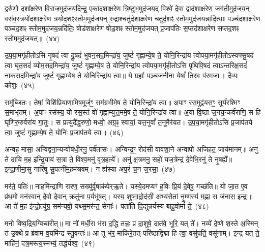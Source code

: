 द्वरु॑णो॒ दशा᳚क्षरेण वि॒राज॒मुद॑जय॒दिन्द्र॒ एका॑\-दशा\-क्षरेण त्रि॒ष्टुभ॒मुद॑जय॒द् विश्वे॑ दे॒वा द्वाद॑शाक्षरेण॒ जग॑ती॒मुद॑जय॒न् वस॑व॒स्त्रयो॑\-दशा\-क्षरेण त्रयोद॒शꣴस्तोम॒मुद॑जयन् रु॒द्राश्चतु॑र्दशा\-क्षरेण चतुर्द॒शꣴ स्तोम॒मुद॑जयन्नादि॒त्याः पञ्च॑\-दशा\-क्षरेण पञ्चद॒शꣴ स्तोम॒मुद॑जय॒न्नदि॑तिः॒ षोड॑शाक्षरेण षोड॒शꣴ स्तोम॒मुद॑जयत् प्र॒जा\-प॑तिः स॒प्तद॑शाक्षरेण सप्तद॒शꣴ स्तोम॒मुद॑जयत्॥~(४४)

{\anuvakamend[{अ॒ज॒य॒त् षट्च॑त्वारिꣳशच्च}]}%

उ॒प॒या॒मगृ॑हीतो\-ऽसि नृ॒षदं॑ त्वा द्रु॒षदं॑ भुवन॒सद॒मिन्द्रा॑य॒ जुष्टं॑ गृह्णाम्ये॒ष ते॒ योनि॒रिन्द्रा॑य त्वोपया॒मगृ॑हीतो\-ऽस्यफ्सु॒षदं॑ त्वा घृत॒सदं॑ व्योम॒सद॒मिन्द्रा॑य॒ जुष्टं॑ गृह्णाम्ये॒ष ते॒ योनि॒रिन्द्रा॑य त्वोपया॒मगृ॑हीतो\-ऽसि पृथिवि॒षदं॑ त्वा\-ऽन्तरिक्ष॒सदं॑ नाक॒सद॒मिन्द्रा॑य॒ जुष्टं॑ गृह्णाम्ये॒ष ते॒ योनि॒रिन्द्रा॑य त्वा॥ ये ग्रहाः᳚ पञ्चज॒नीना॒ येषां᳚ ति॒स्रः प॑रम॒जाः। दैव्यः॒ कोशः॒~(४५)

समु॑ब्जितः। तेषां॒ विशि॑प्रियाणा॒मिष॒मूर्ज॒ꣳ॒ सम॑ग्रभीमे॒ष ते॒ योनि॒रिन्द्रा॑य त्वा॥ अ॒पाꣳ रस॒मुद्व॑यस॒ꣳ॒ सूर्य॑रश्मिꣳ स॒माभृ॑तम्। अ॒पाꣳ रस॑स्य॒ यो रस॒स्तं वो॑ गृह्णाम्युत्त॒ममे॒ष ते॒ योनि॒रिन्द्रा॑य त्वा॥ अ॒या वि॒ष्ठा ज॒नय॒न्कर्व॑राणि॒ स हि घृणि॑रु॒रुर्वरा॑य गा॒तुः। स प्रत्युदै᳚द्ध॒रुणो॒ मध्वो॒ अग्र॒ꣴ॒ स्वायां॒ यत्त॒नुवां᳚ त॒नूमैर॑यत। उ॒प॒या॒मगृ॑हीतो\-ऽसि प्र॒जाप॑तये त्वा॒ जुष्टं॑ गृह्णाम्ये॒ष ते॒ योनिः॑ प्र॒जाप॑तये त्वा॥~(४६)

{\anuvakamend[{कोश॑स्त॒नुवां॒ त्रयो॑दश च}]}%

अन्वह॒ मासा॒ अन्विद्वना॒न्यन्वोष॑धी॒रनु॒ पर्व॑तासः। अन्विन्द्र॒ꣳ॒ रोद॑सी वावशा॒ने अन्वापो॑ अजिहत॒ जाय॑मानम्॥ अनु॑ ते दायि म॒ह इ॑न्द्रि॒याय॑ स॒त्रा ते॒ विश्व॒मनु॑ वृत्र॒हत्ये᳚। अनु॑ क्ष॒त्रमनु॒ सहो॑ यज॒त्रेन्द्र॑ दे॒वेभि॒रनु॑ ते नृ॒षह्ये᳚॥ इ॒न्द्रा॒णीमा॒सु नारि॑षु सु॒पत्नी॑म॒हम॑श्रवम्। न ह्य॑स्या अप॒रं च॒न ज॒रसा॒~(४७)

मर॑ते॒ पतिः॑॥ नाहमि॑न्द्राणि रारण॒ सख्यु॑र्वृ॒षाक॑पेर्‌ऋ॒ते। यस्ये॒दमप्यꣳ॑ ह॒विः प्रि॒यं दे॒वेषु॒ गच्छ॑ति॥ यो जा॒त ए॒व प्र॑थ॒मो मन॑स्वान् दे॒वो दे॒वान् क्रतु॑ना प॒र्यभू॑षत्। यस्य॒ शुष्मा॒द्रोद॑सी॒ अभ्य॑सेतां नृ॒म्णस्य॑ म॒ह्ना स ज॑नास॒ इन्द्रः॑॥ आ ते॑ म॒ह इ॑न्द्रो॒त्यु॑ग्र॒ सम॑न्यवो॒ यथ्स॒मर॑न्त॒ सेनाः᳚। पता॑ति दि॒द्युन्नर्य॑स्य बाहु॒वोर्मा ते॒~(४८)

मनो॑ विष्व॒द्रिय॒ग्विचा॑रीत्॥ मा नो॑ मर्धी॒रा भ॑रा द॒द्धि तन्नः॒ प्र दा॒शुषे॒ दात॑वे॒ भूरि॒ यत् ते᳚। नव्ये॑ दे॒ष्णे श॒स्ते अ॒स्मिन् त॑ उ॒क्थे प्र ब्र॑वाम व॒यमि॑न्द्र स्तु॒वन्तः॑॥ आ तू भ॑र॒ माकि॑रे॒तत् परि॑ष्ठाद्वि॒द्मा हि त्वा॒ वसु॑पतिं॒ वसू॑नाम्। इन्द्र॒ यत् ते॒ माहि॑नं॒ दत्र॒मस्त्य॒स्मभ्यं॒ तद्ध॑र्यश्व॒~(४९)


